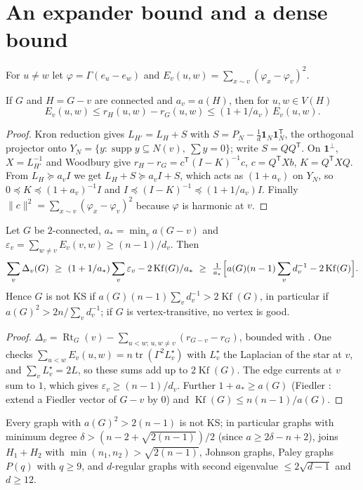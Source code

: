 \documentclass[11pt,a4paper]{report}
\newcommand{\Kf}{\operatorname{Kf}}
\newcommand{\Rt}{\operatorname{Rt}}
\newcommand{\one}{\mathbf{1}}
\begin{document}
\section{An expander bound and a dense bound}
For $u\ne w$ let $\varphi=\Gamma(e_u-e_w)$ and $E_v(u,w)=\sum_{x\sim v}(\varphi_x-\varphi_v)^2$.
\begin{lemma}\label{lem:pair}
If $G$ and $H=G-v$ are connected and $a_v=a(H)$, then for $u,w\in V(H)$
\[
E_v(u,w)\le r_H(u,w)-r_G(u,w)\le(1+1/a_v)\,E_v(u,w).
\]
\end{lemma}
\begin{proof}
Kron reduction gives $L_{H'}=L_H+S$ with $S=P_N-\frac1d\one_N\one_N^{\mathsf T}$, the orthogonal projector onto
$Y_N=\{y:\operatorname{supp}y\subseteq N(v),\ \sum y=0\}$; write $S=QQ^{\mathsf T}$. On $\one^\perp$,
$X=L_{H'}^{-1}$ and Woodbury give $r_H-r_G=c^{\mathsf T}(I-K)^{-1}c$, $c=Q^{\mathsf T}Xb$,
$K=Q^{\mathsf T}XQ$. From $L_H\succeq a_vI$ we get $L_H+S\succeq a_vI+S$, which acts as $(1+a_v)$ on $Y_N$, so
$0\preceq K\preceq(1+a_v)^{-1}I$ and $I\preceq(I-K)^{-1}\preceq(1+1/a_v)I$. Finally
$\|c\|^2=\sum_{x\sim v}(\varphi_x-\varphi_v)^2$ because $\varphi$ is harmonic at $v$.
\end{proof}
\begin{theorem}[note=expander bound]\label{thm:expander}
Let $G$ be $2$-connected, $a_*=\min_va(G-v)$ and $\varepsilon_v=\sum_{w\ne v}E_v(v,w)\ge(n-1)/d_v$. Then
\[
\sum_v\Delta_v(G)\ \ge\ (1+1/a_*)\sum_v\varepsilon_v-2\Kf(G)/a_*\ \ge\ \tfrac1{a_*}\Bigl[a(G)(n-1)\sum_v d_v^{-1}-2\Kf(G)\Bigr].
\]
Hence $G$ is not KS if $a(G)(n-1)\sum_vd_v^{-1}>2\Kf(G)$, in particular if $a(G)^2>2n/\sum_vd_v^{-1}$; if $G$ is
vertex-transitive, no vertex is good.
\end{theorem}
\begin{proof}
$\Delta_v=\Rt_G(v)-\sum_{u<w;\,u,w\ne v}(r_{G-v}-r_G)$, bounded with . One checks
$\sum_{u<w}E_v(u,w)=n\operatorname{tr}(\Gamma^2L^\star_v)$ with $L^\star_v$ the Laplacian of the star at $v$, and
$\sum_vL^\star_v=2L$, so these sums add up to $2\Kf(G)$. The edge currents at $v$ sum to $1$, which gives
$\varepsilon_v\ge(n-1)/d_v$. Further $1+a_*\ge a(G)$ (Fiedler \autocite{Fiedler73}: extend a Fiedler vector of $G-v$
by $0$) and $\Kf(G)\le n(n-1)/a(G)$.
\end{proof}
\begin{corollary}\label{cor:expander}
Every graph with $a(G)^2>2(n-1)$ is not KS; in particular graphs with minimum degree
$\delta>(n-2+\sqrt{2(n-1)})/2$ (since $a\ge2\delta-n+2$), joins $H_1+H_2$ with $\min(n_1,n_2)>\sqrt{2(n-1)}$,
Johnson graphs, Paley graphs $P(q)$ with $q\ge9$, and $d$-regular graphs with second eigenvalue
$\le2\sqrt{d-1}$ and $d\ge12$.
\end{corollary}
\end{document}
